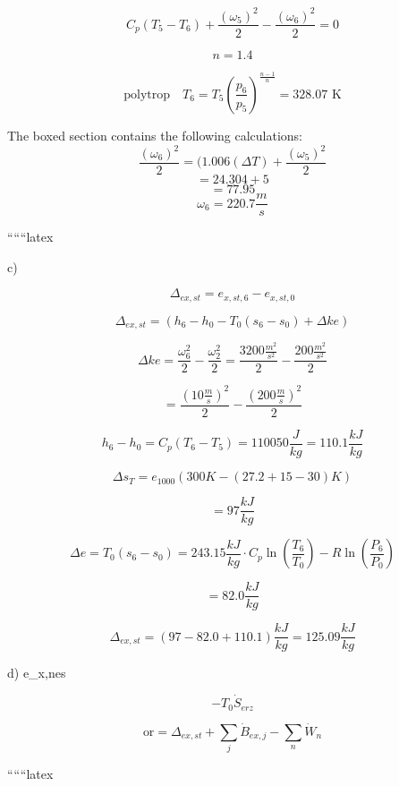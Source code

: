 \[
C_p (T_5 - T_6) + \frac{(\omega_5)^2}{2} - \frac{(\omega_6)^2}{2} = 0
\]

\[
n = 1.4
\]

\[
\text{polytrop} \quad T_6 = T_5 \left( \frac{p_6}{p_5} \right)^{\frac{n-1}{n}} = 328.07 \text{ K}
\]

\begin{center}
\begin{minipage}{0.8\textwidth}
The boxed section contains the following calculations:
\[
\frac{(\omega_6)^2}{2} = (1.006 (\Delta T) + \frac{(\omega_5)^2}{2}
\]
\[
= 24.304 + 5
\]
\[
= 77.95
\]
\[
\omega_6 = 220.7 \frac{m}{s}
\]
\end{minipage}
\end{center}

``````latex

c) 

\[
\Delta_{ex,st} = e_{x,st,6} - e_{x,st,0}
\]

\[
\Delta_{ex,st} = (h_6 - h_0 - T_0 (s_6 - s_0) + \Delta ke)
\]

\[
\Delta ke = \frac{\omega_6^2}{2} - \frac{\omega_2^2}{2} = \frac{3200 \frac{m^2}{s^2}}{2} - \frac{200 \frac{m^2}{s^2}}{2}
\]

\[
= \frac{(10 \frac{m}{s})^2}{2} - \frac{(200 \frac{m}{s})^2}{2}
\]

\[
h_6 - h_0 = C_p (T_6 - T_5) = 110050 \frac{J}{kg} = 110.1 \frac{kJ}{kg}
\]

\[
\Delta s_T = e_{1000} (300K - (27.2 + 15 - 30)K)
\]

\[
= 97 \frac{kJ}{kg}
\]

\[
\Delta e = T_0 (s_6 - s_0) = 243.15 \frac{kJ}{kg} \cdot C_p \ln \left( \frac{T_6}{T_0} \right) - R \ln \left( \frac{P_6}{P_0} \right)
\]

\[
= 82.0 \frac{kJ}{kg}
\]

\[
\Delta_{ex,st} = (97 - 82.0 + 110.1) \frac{kJ}{kg} = 125.09 \frac{kJ}{kg}
\]

d)  \quad e_{x,nes}

\[
- T_0 \dot{S}_{erz}
\]

\[
\text{or} = \Delta_{ex,st} + \sum_j \dot{B}_{ex,j} - \sum_n \dot{W}_n
\]

``````latex


